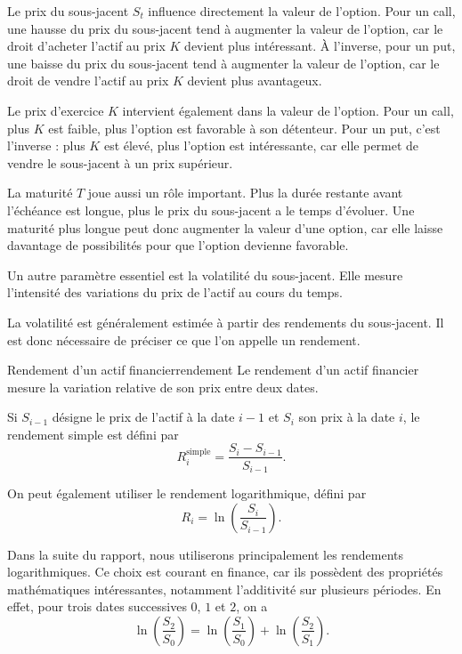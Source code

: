\documentclass[12pt,a4paper]{report}
\begin{document}
Le prix du sous-jacent $S_t$ influence directement la valeur de l'option. Pour un call, une hausse du prix du sous-jacent tend à augmenter la valeur de l'option, car le droit d'acheter l'actif au prix $K$ devient plus intéressant. À l'inverse, pour un put, une baisse du prix du sous-jacent tend à augmenter la valeur de l'option, car le droit de vendre l'actif au prix $K$ devient plus avantageux.

Le prix d'exercice $K$ intervient également dans la valeur de l'option. Pour un call, plus $K$ est faible, plus l'option est favorable à son détenteur. Pour un put, c'est l'inverse : plus $K$ est élevé, plus l'option est intéressante, car elle permet de vendre le sous-jacent à un prix supérieur.

La maturité $T$ joue aussi un rôle important. Plus la durée restante avant l'échéance est longue, plus le prix du sous-jacent a le temps d'évoluer. Une maturité plus longue peut donc augmenter la valeur d'une option, car elle laisse davantage de possibilités pour que l'option devienne favorable.

Un autre paramètre essentiel est la volatilité du sous-jacent. Elle mesure l'intensité des variations du prix de l'actif au cours du temps.

La volatilité est généralement estimée à partir des rendements du sous-jacent. Il est donc nécessaire de préciser ce que l'on appelle un rendement.

\begin{definition}{Rendement d'un actif financier}{rendement}
Le rendement d'un actif financier mesure la variation relative de son prix entre deux dates.

Si $S_{i-1}$ désigne le prix de l'actif à la date $i-1$ et $S_i$ son prix à la date $i$, le rendement simple est défini par
\[
R_i^{\mathrm{simple}} = \frac{S_i - S_{i-1}}{S_{i-1}}.
\]

On peut également utiliser le rendement logarithmique, défini par
\[
R_i = \ln\left(\frac{S_i}{S_{i-1}}\right).
\]
\end{definition}

Dans la suite du rapport, nous utiliserons principalement les rendements logarithmiques. Ce choix est courant en finance, car ils possèdent des propriétés mathématiques intéressantes, notamment l'additivité sur plusieurs périodes. En effet, pour trois dates successives $0$, $1$ et $2$, on a
\[
\ln\left(\frac{S_2}{S_0}\right)
=
\ln\left(\frac{S_1}{S_0}\right)
+
\ln\left(\frac{S_2}{S_1}\right).
\]
\end{document}
